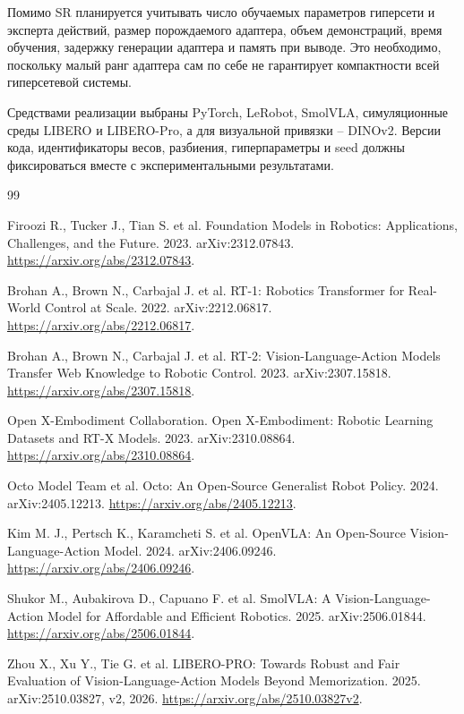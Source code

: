 \documentclass{misisarticle}
\begin{document}
Помимо SR планируется учитывать число обучаемых параметров гиперсети и эксперта действий, размер порождаемого адаптера, объем демонстраций, время обучения, задержку генерации адаптера и память при выводе. Это необходимо, поскольку малый ранг адаптера сам по себе не гарантирует компактности всей гиперсетевой системы.

Средствами реализации выбраны PyTorch, LeRobot, SmolVLA, симуляционные среды LIBERO и LIBERO-Pro, а для визуальной привязки -- DINOv2. Версии кода, идентификаторы весов, разбиения, гиперпараметры и seed должны фиксироваться вместе с экспериментальными результатами.

\begin{thebibliography}{99}

Firoozi R., Tucker J., Tian S. et al. Foundation Models in Robotics: Applications, Challenges, and the Future. 2023. arXiv:2312.07843. \url{https://arxiv.org/abs/2312.07843}.

Brohan A., Brown N., Carbajal J. et al. RT-1: Robotics Transformer for Real-World Control at Scale. 2022. arXiv:2212.06817. \url{https://arxiv.org/abs/2212.06817}.

Brohan A., Brown N., Carbajal J. et al. RT-2: Vision-Language-Action Models Transfer Web Knowledge to Robotic Control. 2023. arXiv:2307.15818. \url{https://arxiv.org/abs/2307.15818}.

Open X-Embodiment Collaboration. Open X-Embodiment: Robotic Learning Datasets and RT-X Models. 2023. arXiv:2310.08864. \url{https://arxiv.org/abs/2310.08864}.

Octo Model Team et al. Octo: An Open-Source Generalist Robot Policy. 2024. arXiv:2405.12213. \url{https://arxiv.org/abs/2405.12213}.

Kim M. J., Pertsch K., Karamcheti S. et al. OpenVLA: An Open-Source Vision-Language-Action Model. 2024. arXiv:2406.09246. \url{https://arxiv.org/abs/2406.09246}.

Shukor M., Aubakirova D., Capuano F. et al. SmolVLA: A Vision-Language-Action Model for Affordable and Efficient Robotics. 2025. arXiv:2506.01844. \url{https://arxiv.org/abs/2506.01844}.

Zhou X., Xu Y., Tie G. et al. LIBERO-PRO: Towards Robust and Fair Evaluation of Vision-Language-Action Models Beyond Memorization. 2025. arXiv:2510.03827, v2, 2026. \url{https://arxiv.org/abs/2510.03827v2}.


\end{thebibliography}
\end{document}
